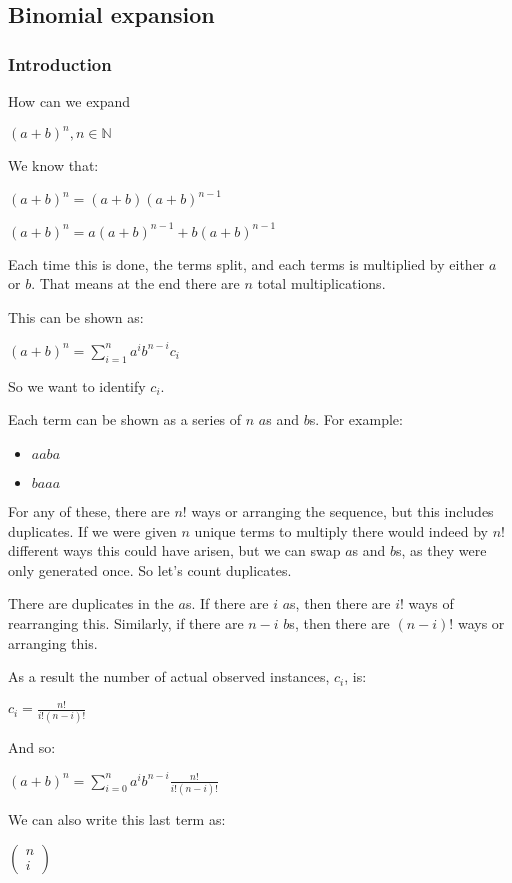 
\subsection{Binomial expansion}

\subsubsection{Introduction}

How can we expand

\((a+b)^n, n\in \mathbb{N}\)

We know that:

\((a+b)^n=(a+b)(a+b)^{n-1}\)

\((a+b)^n=a(a+b)^{n-1}+b(a+b)^{n-1}\)

Each time this is done, the terms split, and each terms is multiplied by either \(a\) or \(b\). That means at the end there are \(n\) total multiplications.

This can be shown as:

\((a+b)^n=\sum_{i=1}^n a^i b^{n-i} c_i\)

So we want to identify \(c_i\).

Each term can be shown as a series of \(n\) \(a\)s and \(b\)s. For example:

\begin{itemize}
\item \(aaba\)
\item \(baaa\)
\end{itemize}

For any of these, there are \(n!\) ways or arranging the sequence, but this includes duplicates. If we were given \(n\) unique terms to multiply there would indeed by \(n!\) different ways this could have arisen, but we can swap \(a\)s and \(b\)s, as they were only generated once. So let's count duplicates.

There are duplicates in the \(a\)s. If there are  \(i\) \(a\)s, then there are \(i!\) ways of rearranging this. Similarly, if there are \(n-i\) \(b\)s, then there are \((n-i)!\) ways or arranging this.

As a result the number of actual observed instances, \(c_i\), is:

\(c_i=\frac{n!}{i!(n-i)!}\)

And so:

\((a+b)^n=\sum^n_{i=0} a^i b^{n-i} \frac{n!}{i!(n-i)!}\)

We can also write this last term as:

\(\begin{pmatrix}n\\i\end{pmatrix}\)

